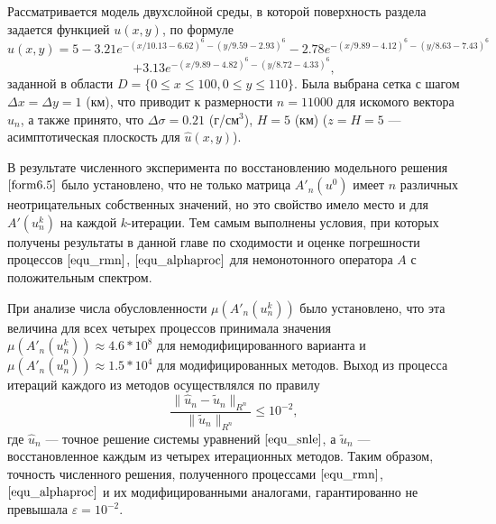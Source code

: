 Рассматривается модель двухслойной среды, в которой поверхность раздела задается функцией $u(x,y)$, по формуле %
$$
\hat{u}(x,y)=5-3.21e^{-(x/10.13-6.62)^6-(y/9.59-2.93)^6}-
2.78e^{-(x/9.89-4.12)^6-(y/8.63-7.43)^6}$$
\begin{equation}\label{form6.5}
+3.13e^{-(x/9.89-4.82)^6-(y/8.72-4.33)^6},
\end{equation}
заданной в области $D=\{0\le x\le 100, 0\le y \le 110\}$. Была выбрана сетка с шагом $\Delta x=\Delta y=1$ (км), что приводит к размерности $n=11000$ для искомого вектора $u_n$, а также принято, что $\Delta\sigma=0.21$ (г/см$^3$), $H=5$ (км) ($z=H=5$ --- асимптотическая плоскость для $\hat{u}(x,y)$).

В результате численного эксперимента по восстановлению модельного решения $\eqref{form6.5}$ было установлено, что не только матрица $A'_n(u^0)$ имеет $n$ различных неотрицательных собственных значений, но это свойство имело место и для $A'(u_n^k)$ на каждой $k$-итерации. Тем самым выполнены условия, при которых получены результаты в данной главе по сходимости и оценке погрешности процессов $\eqref{equ_rmn}$, $\eqref{equ_alphaproc}$ для немонотонного оператора $A$ с положительным спектром. 

При анализе числа обусловленности $\mu(A'_n(u_n^k))$ было установлено, что эта величина для всех четырех процессов принимала значения $\mu(A'_n(u_n^k))\approx 4.6 * 10^{8}$ для немодифицированного варианта и $\mu(A'_n(u_n^0))\approx 1.5 * 10^{4}$ для модифицированных методов. Выход из процесса итераций каждого из методов осуществлялся по правилу
\begin{equation}\label{cond6.6}
\frac{\|\hat{u}_n-\tilde{u}_n\|_{R^n}}{\|\tilde{u}_n\|_{R^n}}\le 10^{-2},
\end{equation}
где $\hat{u}_n$ --- точное решение системы уравнений $\eqref{equ_snle}$, а $\tilde{u}_n$ --- восстановленное каждым из четырех итерационных методов. Таким образом, точность численного решения, полученного процессами $\eqref{equ_rmn}$, $\eqref{equ_alphaproc}$ и их модифицированными аналогами, гарантированно не превышала $\varepsilon=10^{-2}$.

